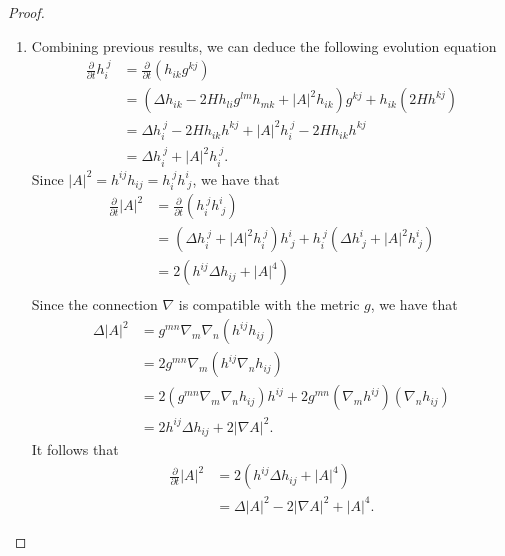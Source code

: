 \documentclass[a4paper]{report}
\theoremstyle{remark}
\begin{document}
\begin{proof}
\begin{enumerate}
		\item Combining previous results, we can deduce the following evolution equation \begin{equation*}
			      \begin{split}
				      \frac{\partial }{\partial t} h_{i}^{\ j}
				      &= \frac{\partial }{\partial t} (h_{ik}^{} g_{}^{kj} )\\
				      &= (\Delta h_{ik}^{} - 2 H h_{li }^{} g_{}^{lm } h_{mk}^{} + \left| A \right| ^2 h_{ik}^{})g_{}^{kj}+ h_{ik}^{} (2H h_{}^{kj} )\\
				      &= \Delta h_{i}^{\ j} - 2H h_{ik}^{} h_{}^{kj} + \left| A \right| ^2 h_{i}^{\ j} - 2H h_{ik}^{} h_{}^{kj}\\
				      &= \Delta h_{i}^{\ j} + \left| A \right| ^2 h_{i}^{\ j}.
			      \end{split}
		      \end{equation*}
		      Since $\left| A \right| ^2=h_{}^{ij} h_{ij}^{} = h_{i}^{\ j} h_{\ j}^{i}$, we have that
		      \begin{equation*}
			      \begin{split}
				      \frac{\partial }{\partial t} \left| A \right| ^2
				      &= \frac{\partial }{\partial t}  (h_{i}^{\ j} h_{\ j}^{i}) \\
				      &= (\Delta h_{i}^{\ j} + \left| A \right| ^2 h_{i}^{\ j})h_{\ j}^{i} + h_{i}^{\ j}(\Delta h_{\ j}^{i} + \left| A \right| ^2 h_{\ j}^{i})\\
				      &= 2(h_{}^{ij} \Delta h_{ij}^{} + \left| A \right| ^4)\\
			      \end{split}
		      \end{equation*}
		      Since the connection $\nabla $ is compatible with the metric $g$, we have that
		      \begin{equation*}
			      \begin{split}
				      \Delta \left| A \right| ^2
				      &= g_{}^{mn } \nabla_{m}\nabla_{n} (h_{}^{ij} h_{ij}^{})  \\
				      &= 2g_{}^{mn } \nabla_{m} (h_{}^{ij} \nabla_{n}h_{ij}^{})  \\
				      &= 2(g_{}^{mn } \nabla_{m}\nabla_{n}h_{ij}^{}) h_{}^{ij} + 2g_{}^{mn } (\nabla_{m} h_{}^{ij}) (\nabla_{n}h_{ij}^{}) \\
				      &= 2 h_{}^{ij} \Delta h_{ij}^{} + 2 \left| \nabla A \right| ^2.
			      \end{split}
		      \end{equation*}
		      It follows that
		      \begin{equation*}
			      \begin{split}
				      \frac{\partial }{\partial t} \left| A \right| ^2
				      &= 2(h_{}^{ij} \Delta h_{ij}^{} + \left| A \right| ^4)\\
				      &= \Delta \left| A \right| ^2 - 2 \left| \nabla A \right| ^2 + \left| A \right| ^4.
			      \end{split}
		      \end{equation*}
	\end{enumerate}
\end{proof}
\end{document}
